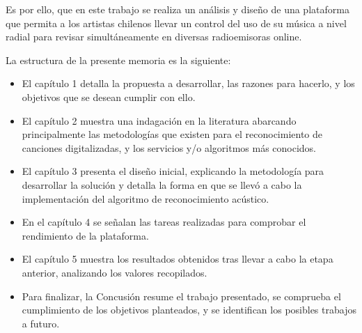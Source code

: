 \bigskip

Es por ello, que en este trabajo se realiza un análisis y diseño de una plataforma 
 que permita a los artistas chilenos llevar un control del uso de su música a nivel radial para revisar simultáneamente en diversas radioemisoras online.
 
\lipsum[1-4]
 
La estructura de la presente memoria es la siguiente:

\begin{itemize}
\item El capítulo 1 detalla la propuesta a desarrollar, las razones para hacerlo, y los objetivos que se desean cumplir con ello.

\item El capítulo 2 muestra una indagación en la literatura abarcando principalmente las metodologías que existen para el reconocimiento de canciones digitalizadas, y los servicios y/o algoritmos más conocidos.

\item El capítulo 3 presenta el diseño inicial, explicando la metodología para desarrollar la solución y detalla la forma en que se llevó a cabo la implementación del algoritmo de reconocimiento acústico.

\item En el capítulo 4 se señalan las tareas realizadas para comprobar el rendimiento de la plataforma.

\item El capítulo 5 muestra los resultados obtenidos tras llevar a cabo la etapa anterior, analizando los valores recopilados.

\item Para finalizar, la Concusión resume el trabajo presentado, se comprueba el cumplimiento de los objetivos planteados, y se identifican los posibles trabajos a futuro.
\end{itemize}



